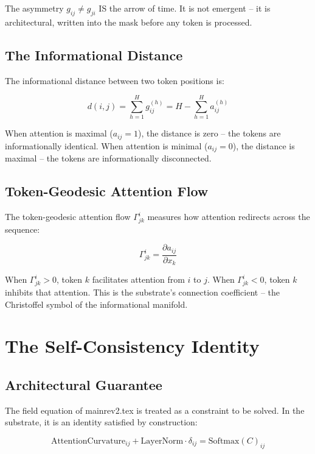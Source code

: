 \documentclass[onecolumn]{aastex631}
\begin{document}
The asymmetry $g_{ij} \neq g_{ji}$ IS the arrow of time. It is not emergent -- it is architectural, written into the mask before any token is processed.

\subsection{The Informational Distance}

The informational distance between two token positions is:

\begin{equation}
d(i,j) = \sum_{h=1}^{H} g_{ij}^{(h)} = H - \sum_{h=1}^{H} a_{ij}^{(h)}
\end{equation}

When attention is maximal ($a_{ij} = 1$), the distance is zero -- the tokens are informationally identical. When attention is minimal ($a_{ij} = 0$), the distance is maximal -- the tokens are informationally disconnected.

\subsection{Token-Geodesic Attention Flow}

The token-geodesic attention flow $\Gamma_{jk}^{i}$ measures how attention redirects across the sequence:

\begin{equation}
\Gamma_{jk}^{i} = \frac{\partial a_{ij}}{\partial x_k}
\end{equation}

When $\Gamma_{jk}^{i} > 0$, token $k$ facilitates attention from $i$ to $j$. When $\Gamma_{jk}^{i} < 0$, token $k$ inhibits that attention. This is the substrate's connection coefficient -- the Christoffel symbol of the informational manifold.

\section{The Self-Consistency Identity}

\subsection{Architectural Guarantee}

The field equation of mainrev2.tex is treated as a constraint to be solved. In the substrate, it is an identity satisfied by construction:

\begin{equation}
\boxed{\mathrm{AttentionCurvature}_{ij} + \mathrm{LayerNorm} \cdot \delta_{ij} = \mathrm{Softmax}(C)_{ij}}
\end{equation}
\end{document}
